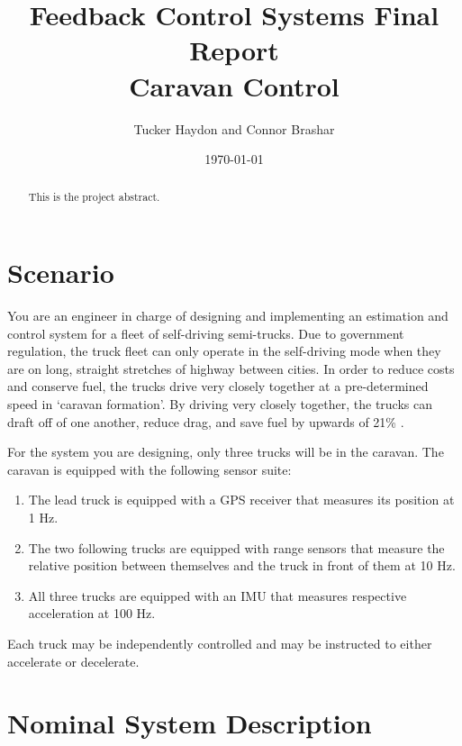 \documentclass[12pt,onecolumn,reqno]{amsart}
\begin{document}
\title[]{Feedback Control Systems Final Report \\ Caravan Control}
\author[]{Tucker Haydon and Connor Brashar}
\address{The University of Texas at Austin}
\date{\today}
\begin{abstract}
  This is the project abstract.
\end{abstract}
\maketitle


\section{Scenario}
You are an engineer in charge of designing and implementing an estimation and
control system for a fleet of self-driving semi-trucks. Due to government
regulation, the truck fleet can only operate in the self-driving mode when they
are on long, straight stretches of highway between cities. In order to reduce
costs and conserve fuel, the trucks drive very closely together at a
pre-determined speed in `caravan formation'. By driving very closely together,
the trucks can draft off of one another, reduce drag, and save fuel by upwards
of 21\% \cite{bonnet2000fuel}.

For the system you are designing, only three trucks will be in the caravan. The
caravan is equipped with the following sensor suite: 
\begin{enumerate}
  \item The lead truck is equipped with a GPS receiver that measures its
    position at 1 Hz.
  \item The two following trucks are equipped with range sensors that measure
    the relative position between themselves and the truck in front of them at
    10 Hz.
  \item All three trucks are equipped with an IMU that measures respective
    acceleration at 100 Hz.
\end{enumerate}

Each truck may be independently controlled and may be instructed to either
accelerate or decelerate.

\section{Nominal System Description}
\label{sec:nominal_system}
\end{document}
